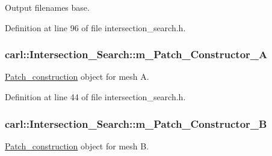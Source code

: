 Output filenames base. 



Definition at line 96 of file intersection\+\_\+search.\+h.

\hypertarget{classcarl_1_1_intersection___search_a3bc66e4e9a0b41d9b20093d4f6ca7611}{}
\subsubsection[{m\+\_\+\+Patch\+\_\+\+Constructor\+\_\+\+A}]{ carl\+::\+Intersection\+\_\+\+Search\+::m\+\_\+\+Patch\+\_\+\+Constructor\+\_\+\+A\hspace{0.3cm}{\ttfamily [protected]}}\label{classcarl_1_1_intersection___search_a3bc66e4e9a0b41d9b20093d4f6ca7611}


\hyperlink{classcarl_1_1_patch__construction}{Patch\+\_\+construction} object for mesh A. 



Definition at line 44 of file intersection\+\_\+search.\+h.

\hypertarget{classcarl_1_1_intersection___search_a2e2b5a2784eeca7b558b6b93ae71a2e8}{}
\subsubsection[{m\+\_\+\+Patch\+\_\+\+Constructor\+\_\+\+B}]{ carl\+::\+Intersection\+\_\+\+Search\+::m\+\_\+\+Patch\+\_\+\+Constructor\+\_\+\+B\hspace{0.3cm}{\ttfamily [protected]}}\label{classcarl_1_1_intersection___search_a2e2b5a2784eeca7b558b6b93ae71a2e8}


\hyperlink{classcarl_1_1_patch__construction}{Patch\+\_\+construction} object for mesh B. 



